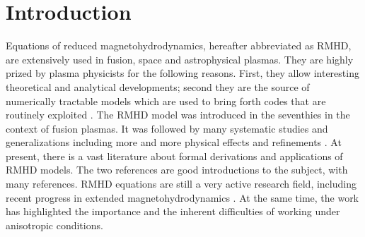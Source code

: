 \documentclass[11pt,reqno]{amsart}
\begin{document}
\section{Introduction}
\label{s:intro}
Equations of reduced magnetohydrodynamics, hereafter abbreviated as RMHD, are extensively used in  fusion, space and astrophysical plasmas. They are highly prized by plasma physicists for the following reasons. First, they allow interesting theoretical and analytical developments; second they are the source of numerically tractable models which are used to bring forth codes that are routinely exploited \cite{BNS98,CH08,KHC98,NLB12,OBH15,OMD17,RHJ12}. The RMHD model was introduced in the seventhies \cite{KP74, Str76} in the context of fusion plasmas. It was followed by many systematic studies  and  generalizations including more and more physical effects and refinements \cite{DS12, DA83, Haz83, IMS83, KW97, KHC98, Str77, ZM92, ZM93}. At present, there is a vast literature about formal derivations and applications of RMHD models. The two references \cite{Bis93, SCD09} are good introductions to the subject, with many references. RMHD equations are still a very active research field, including recent progress in extended magnetohydrodynamics \cite{BC1}. At the same time, the work \cite{BC2} has highlighted the importance and the inherent  difficulties of working under anisotropic conditions.

\end{document}
